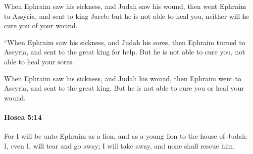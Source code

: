 			\begin{versebox}
					\item[BHS] 
					\item[LXX] 
					\item[ASV] When Ephraim saw his sickness, and Judah saw his wound, then went Ephraim to Assyria, and sent to king Jareb: but he is not able to heal you, neither will he cure you of your wound.
					\item[NIV] “When Ephraim saw his sickness, and Judah his sores, then Ephraim turned to Assyria, and sent to the great king for help. But he is not able to cure you, not able to heal your sores.
					\item[NRSV] When Ephraim saw his sickness, and Judah his wound, then Ephraim went to Assyria, and sent to the great king. But he is not able to cure you or heal your wound.
			\end{versebox}

		\paragraph{Hosea 5:14} %
			\label{HOSEA-5-14}

			For I will be unto Ephraim as a lion, and as a young lion to the house of Judah: I, even I, will tear and go away; I will take away, and none shall rescue him.

